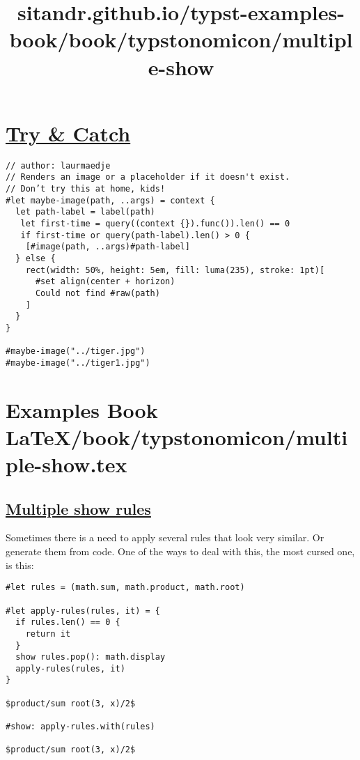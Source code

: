\section{\texorpdfstring{\hyperref[try--catch]{Try \&
Catch}}{Try \& Catch}}\label{try--catch}

\begin{verbatim}
// author: laurmaedje
// Renders an image or a placeholder if it doesn't exist.
// Don’t try this at home, kids!
#let maybe-image(path, ..args) = context {
  let path-label = label(path)
   let first-time = query((context {}).func()).len() == 0
   if first-time or query(path-label).len() > 0 {
    [#image(path, ..args)#path-label]
  } else {
    rect(width: 50%, height: 5em, fill: luma(235), stroke: 1pt)[
      #set align(center + horizon)
      Could not find #raw(path)
    ]
  }
}

#maybe-image("../tiger.jpg")
#maybe-image("../tiger1.jpg")
\end{verbatim}

\pandocbounded{}


\section{Examples Book LaTeX/book/typstonomicon/multiple-show.tex}
\title{sitandr.github.io/typst-examples-book/book/typstonomicon/multiple-show}

\subsection{\texorpdfstring{\hyperref[multiple-show-rules]{Multiple show
rules}}{Multiple show rules}}\label{multiple-show-rules}

Sometimes there is a need to apply several rules that look very similar.
Or generate them from code. One of the ways to deal with this, the most
cursed one, is this:

\begin{verbatim}
#let rules = (math.sum, math.product, math.root)

#let apply-rules(rules, it) = {
  if rules.len() == 0 {
    return it
  }
  show rules.pop(): math.display
  apply-rules(rules, it)
}

$product/sum root(3, x)/2$

#show: apply-rules.with(rules)

$product/sum root(3, x)/2$
\end{verbatim}

